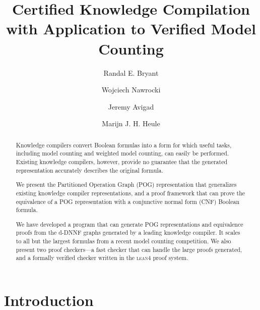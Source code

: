 \documentclass[letterpaper,USenglish,cleveref, autoref, thm-restate]{lipics-v2021}
\title{Certified Knowledge Compilation \\ with Application to Verified Model Counting}
\author{Randal E. Bryant}{Computer Science Department, Carnegie Mellon University, Pittsburgh, PA 15213 USA}{rebryant@cmu.edu}{https://orcid.org/0000-0001-5024-6613}{Supported by NSF grant CCF-2108521}
\author{Wojciech Nawrocki}{Department of Philosophy, Carnegie Mellon University}{wjnawrock@cmu.edu}{https://orcid.org/0000-0002-8839-0618}{}
\author{Jeremy Avigad}{Department of Philosophy, Carnegie Mellon University}{avigad@cmu.edu}{https://orcid.org/0000-0003-1275-315X}{}
\author{Marijn J. H. Heule}{Computer Science Department, Carnegie Mellon University}{marijn@cmu.edu}{https://orcid.org/0000-0002-5587-8801}{Supported by NSF grant CCF-2108521}
\newcommand{\program}[1]{\textsc{#1}}
\newcommand{\lean}{\program{lean4}}
\begin{document}
\maketitle

\begin{abstract}
Knowledge compilers convert Boolean formulas into a form for which
useful tasks, including model counting and weighted model counting,
can easily be performed.  Existing knowledge compilers, however,
provide no guarantee that the generated representation accurately
describes the original formula.

We present the Partitioned Operation Graph (POG) representation that
generalizes existing knowledge compiler representations, and a proof
framework that can prove the equivalence of a POG representation with
a conjunctive normal form (CNF) Boolean formula.

We have developed a program that can generate POG representations and
equivalence proofs from the d-DNNF graphs generated by a leading
knowledge compiler.  It scales to all but the largest formulas from a
recent model counting competition.  We also present two proof
checkers---a fast checker that can handle the large proofs generated,
and a formally verified checker written in the \lean{} proof system.
\end{abstract}

\section{Introduction}
\end{document}
